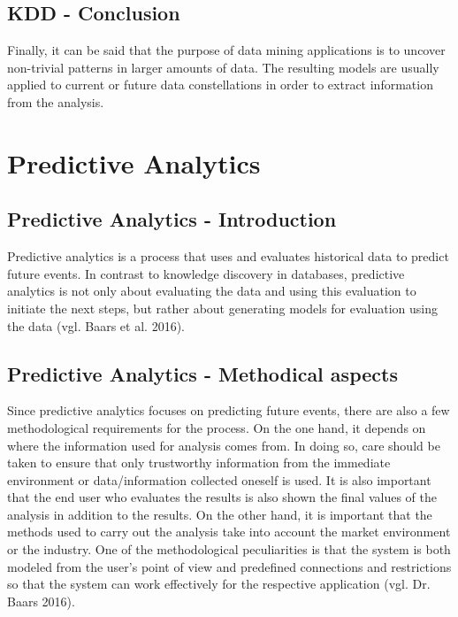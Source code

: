 \documentclass[12pt,twocolumn,twoside]{conference}   %
\begin{document}
\subsection{KDD - Conclusion}
Finally, it can be said that the purpose of data mining applications is to uncover non-trivial patterns in larger amounts of data. The resulting models are usually applied to current or future data constellations in order to extract information from the analysis.

\section{Predictive Analytics}
\subsection{Predictive Analytics - Introduction}
Predictive analytics is a process that uses and evaluates historical data to predict future events. In contrast to knowledge discovery in databases, predictive analytics is not only about evaluating the data and using this evaluation to initiate the next steps, but rather about generating models for evaluation using the data (vgl. Baars et al. 2016). 

\subsection{Predictive Analytics - Methodical aspects}
Since predictive analytics focuses on predicting future events, there are also a few methodological requirements for the process. On the one hand, it depends on where the information used for analysis comes from. In doing so, care should be taken to ensure that only trustworthy information from the immediate environment or data/information collected oneself is used. It is also important that the end user who evaluates the results is also shown the final values of the analysis in addition to the results. On the other hand, it is important that the methods used to carry out the analysis take into account the market environment or the industry. One of the methodological peculiarities is that the system is both modeled from the user's point of view and predefined connections and restrictions so that the system can work effectively for the respective application (vgl. Dr. Baars 2016).
\end{document}
